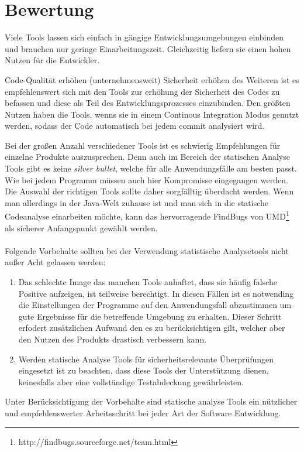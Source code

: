 \section{Bewertung}
Viele Tools lassen sich einfach in gängige Entwicklungsumgebungen einbinden und brauchen nur geringe Einarbeitungszeit. Gleichzeitig liefern sie einen hohen Nutzen für die Entwickler. 

Code-Qualität erhöhen (unternehmensweit)
Sicherheit erhöhen
des Weiteren ist es empfehlenswert sich mit den Tools zur erhöhung der Sicherheit des Codes zu befassen und diese als Teil des Entwicklungsprozesses einzubinden.
Den größten Nutzen haben die Tools, wenns sie in einem Continous Integration Modus genutzt werden, sodass der Code automatisch bei jedem commit analysiert wird.

Bei der großen Anzahl verschiedener Tools ist es schwierig Empfehlungen für einzelne Produkte auszusprechen. Denn auch im Bereich der statischen Analyse Tools gibt es keine \emph{silver bullet}, welche für alle Anwendungsfälle am besten passt. Wie bei jedem Programm müssen auch hier Kompromisse eingegangen werden. Die Auswahl der richtigen Tools sollte daher sorgfälltig überdacht werden. Wenn man allerdings in der Java-Welt zuhause ist und man sich in die statische Codeanalyse einarbeiten möchte, kann das hervorragende FindBugs von UMD\footnote{http://findbugs.sourceforge.net/team.html} als sicherer Anfangspunkt gewählt werden.
\\\\
Folgende Vorbehalte sollten bei der Verwendung statistische Analysetools nicht außer Acht gelassen werden:
\begin{enumerate}
  \item Das schlechte Image das manchen Tools anhaftet, dass sie häufig falsche Positive aufzeigen, ist teilweise berechtigt. In diesen Fällen ist es notwending die Einstellungen der Programme auf den Anwendungsfall abzustimmen um gute Ergebnisse für die betreffende Umgebung zu erhalten. Dieser Schritt erfodert zusätzlichen Aufwand den es zu berücksichtigen gilt, welcher aber den Nutzen des Produkts drastisch verbessern kann.
  \item Werden statische Analyse Tools für sicherheitsrelevante Überprüfungen eingesetzt ist zu beachten, dass diese Tools der Unterstützung dienen, keinesfalls aber eine vollständige Testabdeckung gewährleisten. 
\end{enumerate}

Unter Berücksichtigung der Vorbehalte sind statische analyse Tools ein nützlicher und empfehlenswerter Arbeitsschritt bei jeder  Art der Software Entwicklung.